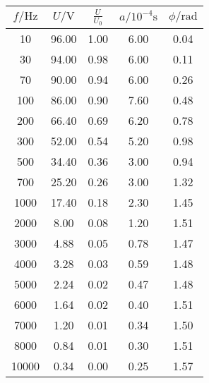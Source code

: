 \label{tab:tabb}
	\begin{tabular}{S[table-format=5.0]S[table-format=2.2]S[table-format=2.2]S[table-format=1.2]S[table-format=1.2]}
		\toprule
		{$f/\si{\hertz}$} & {$U/\si{\volt}$} & {$\frac{U}{U_0}$} & {$a/10^{-4}\si{\second}$} & {$\phi/\si{\radian}$} \\
		 & 96.00 & 1.00 & 6.00 & 0.04 \\
		   30 & 94.00 & 0.98 & 6.00 & 0.11 \\
		   70 & 90.00 & 0.94 & 6.00 & 0.26 \\
		  100 & 86.00 & 0.90 & 7.60 & 0.48 \\
		  200 & 66.40 & 0.69 & 6.20 & 0.78 \\
		  300 & 52.00 & 0.54 & 5.20 & 0.98 \\
		  500 & 34.40 & 0.36 & 3.00 & 0.94 \\
		  700 & 25.20 & 0.26 & 3.00 & 1.32 \\
		 1000 & 17.40 & 0.18 & 2.30 & 1.45 \\
		 2000 & 8.00 & 0.08 & 1.20 & 1.51 \\
		 3000 & 4.88 & 0.05 & 0.78 & 1.47 \\
		 4000 & 3.28 & 0.03 & 0.59 & 1.48 \\
		 5000 & 2.24 & 0.02 & 0.47 & 1.48 \\
		 6000 & 1.64 & 0.02 & 0.40 & 1.51 \\
		 7000 & 1.20 & 0.01 & 0.34 & 1.50 \\
		 8000 & 0.84 & 0.01 & 0.30 & 1.51 \\
		10000 & 0.34 & 0.00 & 0.25 & 1.57 \\
		\bottomrule
	\end{tabular}
